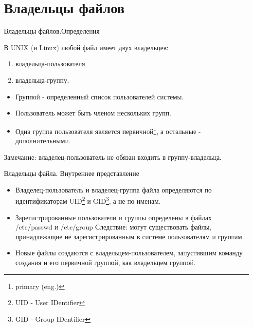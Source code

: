 


\lstset{basicstyle=\tiny}



\firstframe

\section{Владельцы файлов}

\begin{frame}[fragile]{Владельцы файлов.Определения}

  В UNIX (и Linux) любой файл имеет двух владельцев:
  \begin{enumerate}
    \item владельца-пользователя
    \item владельца-группу.
  \end{enumerate} 
   
  \pause

  \begin{itemize}
    \item \alert{Группой} - определенный список пользователей системы.
    \item Пользователь может быть членом нескольких групп. 
    \item Одна группа пользователя является первичной\footnote{primary (eng.)}, а остальные - дополнительными.
  \end{itemize}
  \small{Замечание: владелец-пользователь не обязан входить в группу-владельца.}
  

\end{frame}

\begin{frame}[fragile]{Владельцы файла. Внутреннее представление}
  \begin{itemize}
    \item \alert{Владелец-пользователь} и \alert{владелец-группа} файла определяются по идентификаторам \alert{UID}\footnote{UID - User IDentifier} и \alert{GID}\footnote{GID - Group IDentifier}, а не по именам. 
 \pause
    \item Зарегистрированные пользователи и группы определены в файлах \alert{/etc/passwd} и \alert{/etc/group} \newline
    Следствие: могут существовать файлы, принадлежащие не зарегистрированным в системе пользователям и группам. \pause
    \item Новые файлы создаются с владельцем-пользователем, запустившим команду создания и его первичной группой, как владельцем группой. \pause
  \end{itemize}

\end{frame}

